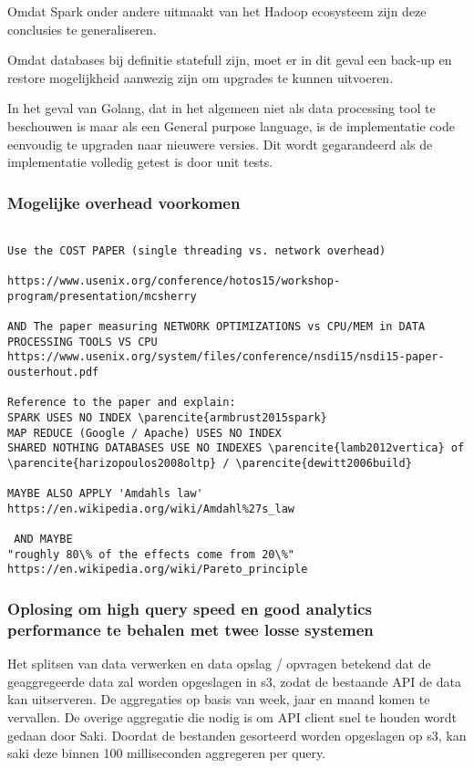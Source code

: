 Omdat Spark onder andere uitmaakt van het Hadoop ecosysteem zijn deze conclusies te generaliseren.

Omdat databases bij definitie statefull zijn, moet er in dit geval een back-up en restore mogelijkheid aanwezig zijn om upgrades te kunnen uitvoeren.

In het geval van Golang, dat in het algemeen niet als data processing tool te beschouwen is maar als een General purpose language, is de implementatie code eenvoudig te upgraden naar nieuwere versies. Dit wordt gegarandeerd als de implementatie volledig getest is door unit tests. 


\subsubsection{\textbf{Mogelijke overhead voorkomen}}

\begin{verbatim}

Use the COST PAPER (single threading vs. network overhead)

https://www.usenix.org/conference/hotos15/workshop-program/presentation/mcsherry

AND The paper measuring NETWORK OPTIMIZATIONS vs CPU/MEM in DATA PROCESSING TOOLS VS CPU
https://www.usenix.org/system/files/conference/nsdi15/nsdi15-paper-ousterhout.pdf

Reference to the paper and explain:
SPARK USES NO INDEX \parencite{armbrust2015spark}
MAP REDUCE (Google / Apache) USES NO INDEX 
SHARED NOTHING DATABASES USE NO INDEXES \parencite{lamb2012vertica} of \parencite{harizopoulos2008oltp} / \parencite{dewitt2006build}

MAYBE ALSO APPLY 'Amdahls law'
https://en.wikipedia.org/wiki/Amdahl%27s_law

 AND MAYBE 
"roughly 80\% of the effects come from 20\%"
https://en.wikipedia.org/wiki/Pareto_principle

\end{verbatim}


\subsubsection{\textbf{Oplosing om  high query speed en good analytics performance te behalen met  twee losse systemen}}

Het splitsen van data verwerken en data opslag / opvragen betekend dat de geaggregeerde data zal worden opgeslagen in s3, zodat de bestaande API de data kan uitserveren. 
De aggregaties op basis van week, jaar en maand komen te vervallen. De overige aggregatie die nodig is om API client snel te houden wordt gedaan door Saki. Doordat de bestanden gesorteerd worden opgeslagen op s3, kan saki deze binnen 100 milliseconden aggregeren per query.

